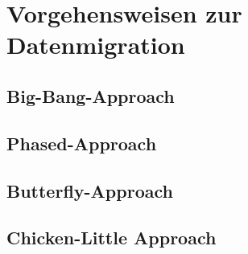 \section{Vorgehensweisen zur Datenmigration}
\label{chapter:vorgehensweisen}

\subsection{Big-Bang-Approach}


\subsection{Phased-Approach}


\subsection{Butterfly-Approach}


\subsection{Chicken-Little Approach}